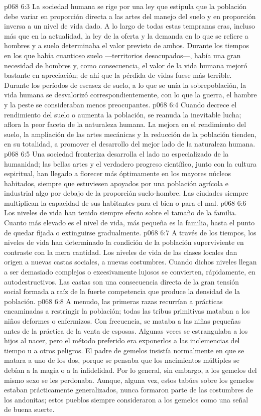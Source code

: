 \vs p068 6:3 \pc La sociedad humana se rige por una ley que estipula que la población debe variar en proporción directa a las artes del manejo del suelo y en proporción inversa a un nivel de vida dado. A lo largo de todas estas tempranas eras, incluso más que en la actualidad, la ley de la oferta y la demanda en lo que se refiere a hombres y a suelo determinaba el valor previsto de ambos. Durante los tiempos en los que había cuantioso suelo ---territorios desocupados---, había una gran necesidad de hombres y, como consecuencia, el valor de la vida humana mejoró bastante en apreciación; de ahí que la pérdida de vidas fuese más terrible. Durante los períodos de escasez de suelo, a lo que se unía la sobrepoblación, la vida humana se desvalorizó correspondientemente, con lo que la guerra, el hambre y la peste se consideraban menos preocupantes.
\vs p068 6:4 Cuando decrece el rendimiento del suelo o aumenta la población, se reanuda la inevitable lucha; aflora la peor faceta de la naturaleza humana. La mejora en el rendimiento del suelo, la ampliación de las artes mecánicas y la reducción de la población tienden, en su totalidad, a promover el desarrollo del mejor lado de la naturaleza humana.
\vs p068 6:5 \pc Una sociedad fronteriza desarrolla el lado no especializado de la humanidad; las bellas artes y el verdadero progreso científico, junto con la cultura espiritual, han llegado a florecer más óptimamente en los mayores núcleos habitados, siempre que estuviesen apoyados por una población agrícola e industrial algo por debajo de la proporción suelo\hyp{}hombre. Las ciudades siempre multiplican la capacidad de sus habitantes para el bien o para el mal.
\vs p068 6:6 Los niveles de vida han tenido siempre efecto sobre el tamaño de la familia. Cuanto más elevado es el nivel de vida, más pequeña es la familia, hasta el punto de quedar fijada o extinguirse gradualmente.
\vs p068 6:7 A través de los tiempos, los niveles de vida han determinado la condición de la población superviviente en contraste con la mera cantidad. Los niveles de vida de las clases locales dan origen a nuevas castas sociales, a nuevas costumbres. Cuando dichos niveles llegan a ser demasiado complejos o excesivamente lujosos se convierten, rápidamente, en autodestructivos. Las castas son una consecuencia directa de la gran tensión social formada a raíz de la fuerte competencia que produce la densidad de la población.
\vs p068 6:8 A menudo, las primeras razas recurrían a prácticas encaminadas a restringir la población; todas las tribus primitivas mataban a los niños deformes o enfermizos. Con frecuencia, se mataba a las niñas pequeñas antes de la práctica de la venta de esposas. Algunas veces se estrangulaba a los hijos al nacer, pero el método preferido era exponerlos a las inclemencias del tiempo u a otros peligros. El padre de gemelos insistía normalmente en que se matara a uno de los dos, porque se pensaba que los nacimientos múltiples se debían a la magia o a la infidelidad. Por lo general, sin embargo, a los gemelos del mismo sexo se les perdonaba. Aunque, alguna vez, estos tabúes sobre los gemelos estaban prácticamente generalizados, nunca formaron parte de las costumbres de los andonitas; estos pueblos siempre consideraron a los gemelos como una señal de buena suerte.
